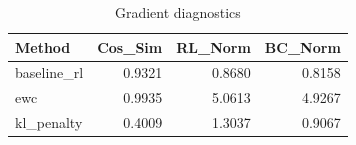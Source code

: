 \begin{table}[htbp]
\centering
\caption{Gradient diagnostics}
\label{tab:grad-diag}
\begin{tabular}{lrrr}
\toprule
\textbf{Method} & \textbf{Cos\_Sim} & \textbf{RL\_Norm} & \textbf{BC\_Norm} \\
\midrule
baseline\_rl & 0.9321 & 0.8680 & 0.8158 \\
ewc & 0.9935 & 5.0613 & 4.9267 \\
kl\_penalty & 0.4009 & 1.3037 & 0.9067 \\
\bottomrule
\end{tabular}
\end{table}